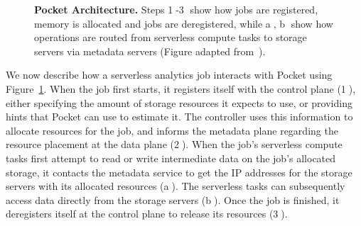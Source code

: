 \begin{figure}
  \vspace{-1.5em}
  \caption{\small\textbf{Pocket Architecture.} Steps \textcircled{1}-\textcircled{3} show how jobs are registered, memory is allocated and jobs are deregistered, while \textcircled{a}, \textcircled{b} show how operations are routed from serverless compute tasks to storage servers via metadata servers (Figure adapted from~\cite{pocket}).}\vspace{-1em}
  \label{fig:pocket-arch}
\end{figure}

 We now describe how a serverless analytics job interacts with Pocket using Figure~\ref{fig:pocket-arch}. When the job first starts, it registers itself with the control plane (\textcircled{1}), either specifying the amount of storage resources it expects to use, or providing hints that Pocket can use to estimate it. The controller uses this information to allocate resources for the job, and informs the metadata plane regarding the resource placement at the data plane (\textcircled{2}). When the job's serverless compute tasks first attempt to read or write intermediate data on the job's allocated storage, it contacts the metadata service to get the IP addresses for the storage servers with its allocated resources (\textcircled{a}). The serverless tasks can subsequently access data directly from the storage servers (\textcircled{b}). Once the job is finished, it deregisters itself at the control plane to release its resources (\textcircled{3}).


